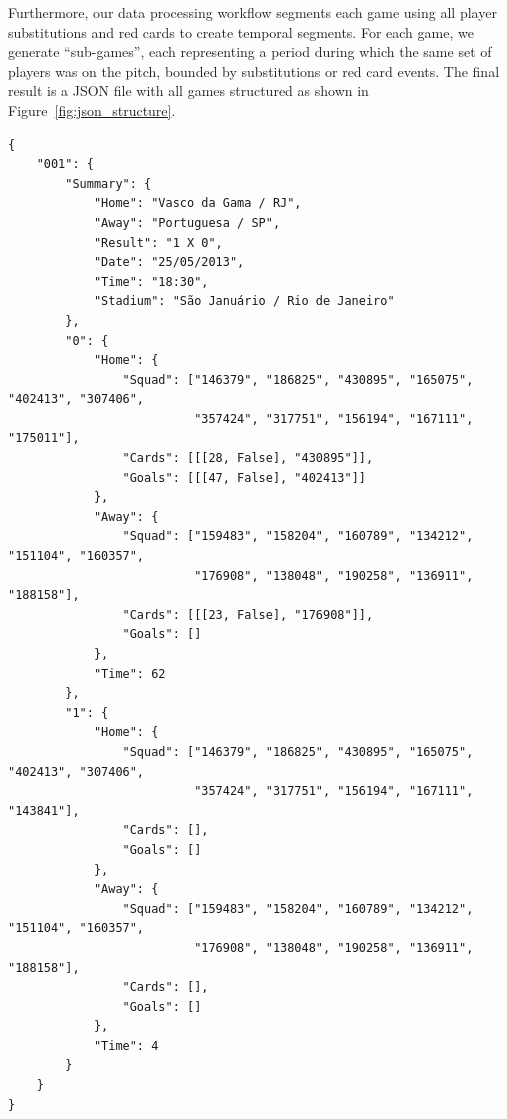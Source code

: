 Furthermore, our data processing workflow segments each game using all player substitutions and red cards to create temporal segments.
For each game, we generate ``sub-games'', each representing a period during which the same set of players was on the pitch, bounded by substitutions or red card events.
The final result is a JSON file with all games structured as shown in Figure~\ref{fig:json_structure}.
\begin{center}
    \lstset{style=json}
    \begin{lstlisting}
{
    "001": {
        "Summary": {
            "Home": "Vasco da Gama / RJ",
            "Away": "Portuguesa / SP",
            "Result": "1 X 0",
            "Date": "25/05/2013",
            "Time": "18:30",
            "Stadium": "São Januário / Rio de Janeiro"
        },
        "0": {
            "Home": {
                "Squad": ["146379", "186825", "430895", "165075", "402413", "307406",
                          "357424", "317751", "156194", "167111", "175011"],
                "Cards": [[[28, False], "430895"]],
                "Goals": [[[47, False], "402413"]]
            },
            "Away": {
                "Squad": ["159483", "158204", "160789", "134212", "151104", "160357",
                          "176908", "138048", "190258", "136911", "188158"],
                "Cards": [[[23, False], "176908"]],
                "Goals": []
            },
            "Time": 62
        },
        "1": {
            "Home": {
                "Squad": ["146379", "186825", "430895", "165075", "402413", "307406",
                          "357424", "317751", "156194", "167111", "143841"],
                "Cards": [],
                "Goals": []
            },
            "Away": {
                "Squad": ["159483", "158204", "160789", "134212", "151104", "160357",
                          "176908", "138048", "190258", "136911", "188158"],
                "Cards": [],
                "Goals": []
            },
            "Time": 4
        }
    }
}
    \end{lstlisting}
    \label{fig:json_structure}
\end{center}

